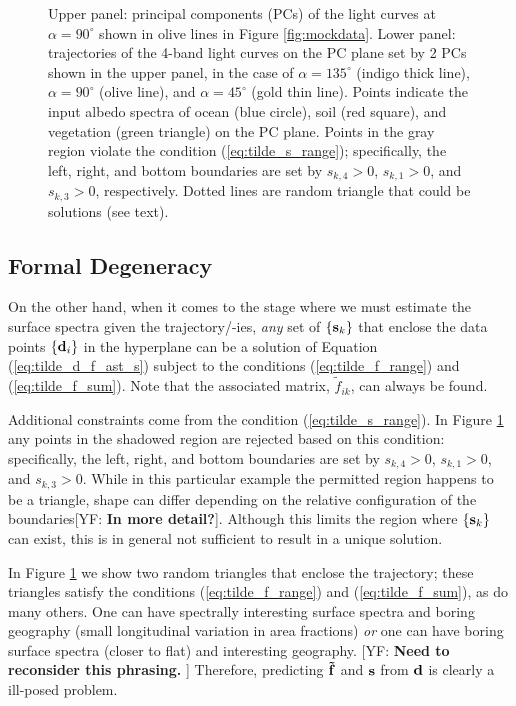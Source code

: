 \documentclass[iop,numberedappendix,apj,]{emulateapj}
\def\fast{\tilde f}
\def\memoYF#1{\color{red}[YF: {\bf #1}]\color{black}}
\begin{document}
\begin{figure}[t]
    \caption{Upper panel: principal components (PCs) of the light curves at $\alpha = 90^{\circ }$ shown in olive lines in Figure \ref{fig:mockdata}. Lower panel: trajectories of the 4-band light curves on the PC plane set by 2 PCs shown in the upper panel, in the case of $\alpha = 135^{\circ }$ (indigo thick line), $\alpha = 90^{\circ }$ (olive line), and $\alpha = 45^{\circ }$ (gold thin line). Points indicate the input albedo spectra of ocean (blue circle), soil (red square), and vegetation (green triangle) on the PC plane. Points in the gray region violate the condition (\ref{eq:tilde_s_range}); specifically, the left, right, and bottom boundaries are set by $s_{k,4} > 0$, $s_{k,1} > 0$, and $s_{k,3}> 0$, respectively. 
Dotted lines are random triangle that could be solutions (see text). }
    \label{fig:trajectory}
\end{figure}

\subsection{Formal Degeneracy}
\label{ss:degeneracy}

On the other hand, when it comes to the stage where we must estimate the surface spectra given the trajectory/-ies, {\it any} set of $\{ {\bf s}_k \}$ that enclose the data points $\{{\bf d}_i\}$ in the hyperplane can be a solution of Equation (\ref{eq:tilde_d_f_ast_s}) subject to the conditions (\ref{eq:tilde_f_range}) and (\ref{eq:tilde_f_sum}). 
Note that the associated matrix, $\fast _{ik}$, can always be found. 

Additional constraints come from the condition (\ref{eq:tilde_s_range}). 
In Figure \ref{fig:trajectory} any points in the shadowed region are rejected based on this condition: specifically, the left, right, and bottom boundaries are set by $s_{k,4}> 0$, $s_{k,1}> 0$, and $s_{k,3}> 0$. 
While in this particular example the permitted region happens to be a triangle, shape can differ depending on the relative configuration of the boundaries\memoYF{In more detail?}. 
Although this limits the region where $\{ {\bf s}_k \}$ can exist,   
this is in general not sufficient to result in a unique solution. 

In Figure \ref{fig:trajectory} we show two random triangles that enclose the trajectory; these triangles satisfy the conditions (\ref{eq:tilde_f_range}) and (\ref{eq:tilde_f_sum}), as do many others. 
One can have spectrally interesting surface spectra and boring geography (small longitudinal variation in area fractions) {\it or} one can have boring surface spectra (closer to flat) and interesting geography. \memoYF{Need to reconsider this phrasing. }
Therefore, predicting ${\bf \fast }$ and ${\bf s}$ from ${\bf d}$ is clearly a ill-posed problem. 
\end{document}
